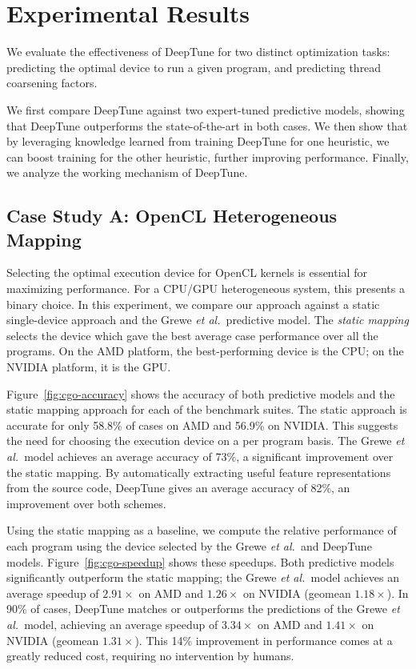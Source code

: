 \section{Experimental Results} \label{sec:results}

We evaluate the effectiveness of DeepTune for two distinct optimization tasks: predicting the optimal device to run a given program, and predicting thread coarsening factors.

We first compare DeepTune against two expert-tuned predictive models, showing that DeepTune outperforms the state-of-the-art in both cases. We then show that by leveraging knowledge learned from training DeepTune for one heuristic, we can boost training for the other heuristic, further improving performance. Finally, we analyze the working mechanism of DeepTune.


\subsection{Case Study A: OpenCL Heterogeneous Mapping}

Selecting the optimal execution device for OpenCL kernels is essential for maximizing performance. For a CPU/GPU heterogeneous system, this presents a binary choice. In this experiment, we compare our approach against a static single-device approach and the Grewe \emph{et al.\ }predictive model. The \emph{static mapping} selects the device which gave the best average case performance over all the programs. On the AMD platform, the best-performing device is the CPU; on the NVIDIA platform, it is the GPU.

Figure~\ref{fig:cgo-accuracy} shows the accuracy of both predictive models and the static mapping approach for each of the benchmark suites. The static approach is accurate for only 58.8\% of cases on AMD and 56.9\% on NVIDIA. This suggests the need for choosing the execution device on a per program basis. The Grewe \emph{et al.\ }model achieves an average accuracy of 73\%, a significant improvement over the static mapping. By automatically extracting useful feature representations from the source code, DeepTune gives an average accuracy of 82\%, an improvement over both schemes.

Using the static mapping as a baseline, we compute the relative performance of each program using the device selected by the Grewe \emph{et al.\ }and DeepTune models. Figure~\ref{fig:cgo-speedup} shows these speedups. Both predictive models significantly outperform the static mapping; the Grewe \emph{et al.\ }model achieves an average speedup of $2.91\times$ on AMD and $1.26\times$ on NVIDIA (geomean $1.18\times$). In 90\% of cases, DeepTune matches or outperforms the predictions of the Grewe \emph{et al.\ }model, achieving an average speedup of $3.34\times$ on AMD and $1.41\times$ on NVIDIA (geomean $1.31\times$). This 14\% improvement in performance comes at a greatly reduced cost, requiring no intervention by humans.

